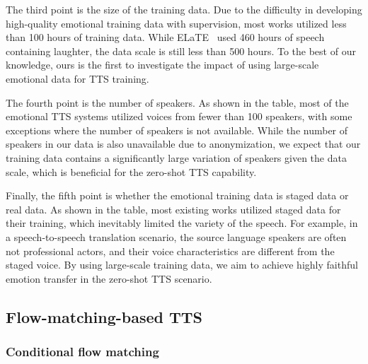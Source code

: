The third point is the size of the training data. Due to the difficulty in developing high-quality emotional training data with supervision, most works utilized less than 100 hours of training data. While ELaTE~\cite{kanda2024making} used 460 hours of speech containing laughter, the data scale is still less than 500 hours. To the best of our knowledge, ours is the first to investigate the impact of using large-scale emotional data for TTS training.

The fourth point is the number of speakers. As shown in the table, most of the emotional TTS systems utilized voices from fewer than 100 speakers, with some exceptions where the number of speakers is not available. While the number of speakers in our data is also unavailable due to anonymization, we expect that our training data contains a significantly large variation of speakers given the data scale, which is beneficial for the zero-shot TTS capability.

Finally, the fifth point is whether the emotional training data is staged data or real data. As shown in the table, most existing works utilized staged data for their training, which inevitably limited the variety of the speech. For example, in a speech-to-speech translation scenario, the source language speakers are often not professional actors, and their voice characteristics are different from the staged voice. By using large-scale training data, we aim to achieve highly faithful emotion transfer in the zero-shot TTS scenario.


\vspace{-.5em}
\subsection{Flow-matching-based TTS}
\vspace{-.5em}
\subsubsection{Conditional flow matching}
\vspace{-.5em}

